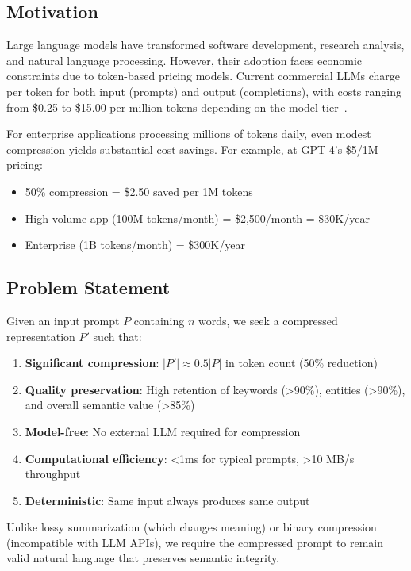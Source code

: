\subsection{Motivation}

Large language models have transformed software development, research analysis, and natural language processing. However, their adoption faces economic constraints due to token-based pricing models. Current commercial LLMs charge per token for both input (prompts) and output (completions), with costs ranging from \$0.25 to \$15.00 per million tokens depending on the model tier~\cite{anthropic2024pricing,openai2024pricing}.

For enterprise applications processing millions of tokens daily, even modest compression yields substantial cost savings. For example, at GPT-4's \$5/1M pricing:

\begin{itemize}
    \item 50\% compression = \$2.50 saved per 1M tokens
    \item High-volume app (100M tokens/month) = \$2,500/month = \$30K/year
    \item Enterprise (1B tokens/month) = \$300K/year
\end{itemize}

\subsection{Problem Statement}

Given an input prompt $P$ containing $n$ words, we seek a compressed representation $P'$ such that:

\begin{enumerate}
    \item \textbf{Significant compression}: $|P'| \approx 0.5|P|$ in token count (50\% reduction)
    \item \textbf{Quality preservation}: High retention of keywords (>90\%), entities (>90\%), and overall semantic value (>85\%)
    \item \textbf{Model-free}: No external LLM required for compression
    \item \textbf{Computational efficiency}: <1ms for typical prompts, >10 MB/s throughput
    \item \textbf{Deterministic}: Same input always produces same output
\end{enumerate}

Unlike lossy summarization (which changes meaning) or binary compression (incompatible with LLM APIs), we require the compressed prompt to remain valid natural language that preserves semantic integrity.

